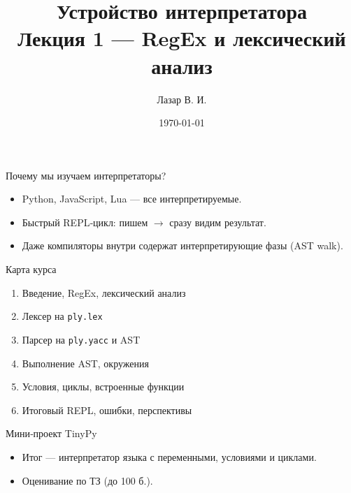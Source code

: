 \documentclass[aspectratio=169]{beamer}
\title[Лекция 1]{Устройство интерпретатора\\ \small Лекция 1 — RegEx и лексический анализ}
\author{Лазар В. И.}
\institute[10 класс]{Школьный курс программирования}
\date{\today}
\begin{document}
\begin{frame}
	\titlepage
\end{frame}
\begin{frame}{Почему мы изучаем интерпретаторы?}
	\begin{itemize}
		\item Python, JavaScript, Lua — все интерпретируемые.
		\item Быстрый REPL‑цикл: пишем $\rightarrow$ сразу видим результат.
		\item Даже компиляторы внутри содержат интерпретирующие фазы (AST walk).
	\end{itemize}
	\pause
\end{frame}

\begin{frame}{Карта курса}
	\begin{enumerate}
		\item Введение, RegEx, лексический анализ
		\item Лексер на \texttt{ply.lex}
		\item Парсер на \texttt{ply.yacc} и AST
		\item Выполнение AST, окружения
		\item Условия, циклы, встроенные функции
		\item Итоговый REPL, ошибки, перспективы
	\end{enumerate}
\end{frame}

\begin{frame}{Мини‑проект TinyPy}
	\begin{itemize}
		\item Итог — интерпретатор языка с переменными, условиями и циклами.
		\item Оценивание по ТЗ (до 100 б.).
	\end{itemize}
\end{frame}
\end{document}
